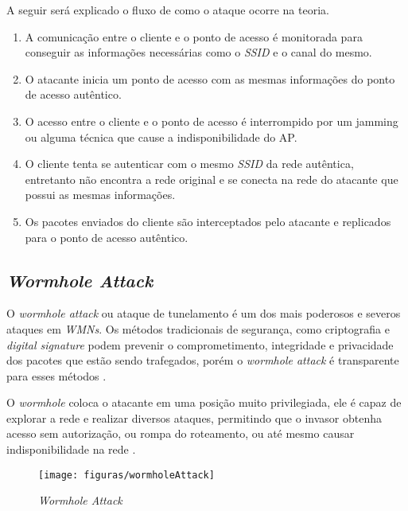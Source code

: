 \par A seguir ser\'a explicado o fluxo de como o ataque ocorre na teoria.
\begin{enumerate}
    \item A comunica\c{c}\~ao entre o cliente e o ponto de acesso \'e monitorada para conseguir as informa\c{c}\~oes necess\'arias como o \emph{SSID} e o canal do mesmo.
    \item O atacante inicia um ponto de acesso com as mesmas informa\c{c}\~oes do ponto de acesso aut\^entico.
    \item O acesso entre o cliente e o ponto de acesso \'e interrompido por um jamming ou alguma t\'ecnica que cause a indisponibilidade do AP.
    \item O cliente tenta se autenticar com o mesmo \emph{SSID} da rede aut\^entica, entretanto n\~ao encontra a rede original e se conecta na rede do atacante que possui as mesmas informa\c{c}\~oes.
    \item Os pacotes enviados do cliente s\~ao interceptados pelo atacante e replicados para o ponto de acesso aut\^entico.
\end{enumerate}

\subsection{\emph{Wormhole Attack}}
\par O \emph{wormhole attack} ou ataque de tunelamento é um dos mais poderosos e severos ataques em \emph{WMNs}. Os métodos tradicionais de segurança, como criptografia e \emph{digital signature} podem prevenir o comprometimento, integridade e privacidade dos pacotes que estão sendo trafegados, porém o \emph{wormhole attack} é transparente para esses métodos \cite{zhou2012}.

\par O \emph{wormhole} coloca o atacante em uma posição muito privilegiada, ele é capaz de explorar a rede e realizar diversos ataques, permitindo que o invasor obtenha acesso sem autorização, ou rompa do roteamento, ou até mesmo causar indisponibilidade na rede \cite{hu2003}.

\begin{figure}[ht]
	\caption{\emph{Wormhole Attack}}
	\centering
		\texttt{[image: figuras/wormholeAttack]}
\end{figure}

